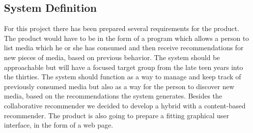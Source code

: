 \subsection{System Definition}
\label{SysDefinition}

For this project there has been prepared several requirements for the product. The product would have to be in the form of a program which allows a person to list media which he or she has consumed and then receive recommendations for new pieces of media, based on previous behavior. The system should be approachable but will have a focused target group from the late teen years into the thirties. The system should function as a way to manage and keep track of previously consumed media but also as a way for the person to discover new media, based on the recommendations the system generates. Besides the collaborative recommender we decided to develop a hybrid with a content-based recommender. The product is also going to prepare a fitting graphical user interface, in the form of a web page.

